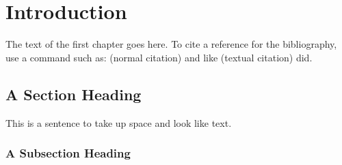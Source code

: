 \chapter{Introduction}


The text of the first chapter goes here. To cite a reference for the
bibliography, use a command such as: \cite{newton1934principia} (normal citation) and like \citet{einstein1916foundation} (textual citation) did.
\section{A Section Heading}
This is a sentence to take up space and look like text.
\subsection{A Subsection Heading}

